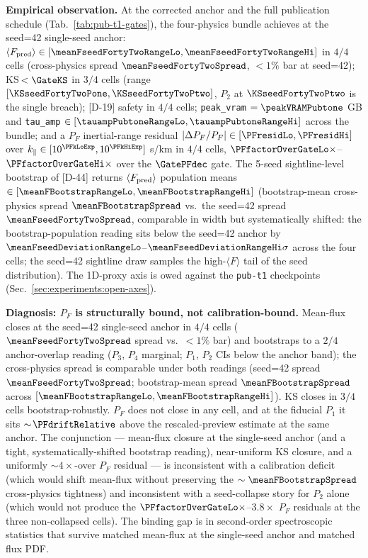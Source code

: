\textbf{Empirical observation.} At the corrected anchor and the full publication schedule (Tab.~\ref{tab:pub-t1-gates}), the four-physics bundle achieves at the seed=42 single-seed anchor: $\langle F_{\text{pred}}\rangle \in [\meanFseedFortyTwoRangeLo, \meanFseedFortyTwoRangeHi]$ in $4/4$ cells (cross-physics spread $\meanFseedFortyTwoSpread$, $<\!1\%$ bar at seed=42); KS$\,< \GateKS$ in $3/4$ cells (range $[\KSseedFortyTwoPone, \KSseedFortyTwoPtwo]$, $P_2$ at $\KSseedFortyTwoPtwo$ is the single breach); [D-19] safety in $4/4$ cells; \texttt{peak\_vram} $= \peakVRAMPubtone$ GB and \texttt{tau\_amp} $\in [\tauampPubtoneRangeLo, \tauampPubtoneRangeHi]$ across the bundle; and a $P_F$ inertial-range residual $|\Delta P_F/P_F| \in [\PFresidLo, \PFresidHi]$ over $k_\parallel \in [10^{\PFkLoExp}, 10^{\PFkHiExp}]$ s/km in $4/4$ cells, $\PFfactorOverGateLo\times$--$\PFfactorOverGateHi\times$ over the $\GatePFdec$ gate. The 5-seed sightline-level bootstrap of [D-44] returns $\langle F_{\rm pred}\rangle$ population means $\in [\meanFBootstrapRangeLo, \meanFBootstrapRangeHi]$ (bootstrap-mean cross-physics spread $\meanFBootstrapSpread$ vs.\ the seed=42 spread $\meanFseedFortyTwoSpread$, comparable in width but systematically shifted: the bootstrap-population reading sits below the seed=42 anchor by $\meanFseedDeviationRangeLo$--$\meanFseedDeviationRangeHi\sigma$ across the four cells; the seed=42 sightline draw samples the high-$\langle F\rangle$ tail of the seed distribution). The 1D-proxy axis is owed against the \texttt{pub-t1} checkpoints (Sec.~\ref{sec:experiments:open-axes}).

\textbf{Diagnosis: $P_F$ is structurally bound, not calibration-bound.} Mean-flux closes at the seed=42 single-seed anchor in $4/4$ cells ($\meanFseedFortyTwoSpread$ spread vs.\ $<\!1\%$ bar) and bootstraps to a $2/4$ anchor-overlap reading ($P_3$, $P_4$ marginal; $P_1$, $P_2$ CIs below the anchor band); the cross-physics spread is comparable under both readings (seed=42 spread $\meanFseedFortyTwoSpread$; bootstrap-mean spread $\meanFBootstrapSpread$ across $[\meanFBootstrapRangeLo, \meanFBootstrapRangeHi]$). KS closes in $3/4$ cells bootstrap-robustly. $P_F$ does not close in any cell, and at the fiducial $P_1$ it sits $\sim\!\PFdriftRelative$ above the rescaled-preview estimate at the same anchor. The conjunction --- mean-flux closure at the single-seed anchor (and a tight, systematically-shifted bootstrap reading), near-uniform KS closure, and a uniformly $\sim\!4\times$-over $P_F$ residual --- is inconsistent with a calibration deficit (which would shift mean-flux without preserving the $\sim \meanFBootstrapSpread$ cross-physics tightness) and inconsistent with a seed-collapse story for $P_2$ alone (which would not produce the $\PFfactorOverGateLo\times$--$3.8\times$ $P_F$ residuals at the three non-collapsed cells). The binding gap is in second-order spectroscopic statistics that survive matched mean-flux at the single-seed anchor and matched flux PDF.

